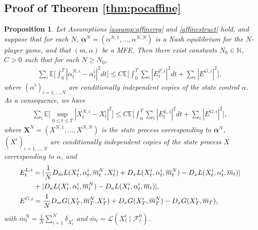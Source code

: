 \documentclass[11pt,reqno]{amsart}
\numberwithin{equation}{section}
\newtheorem{proposition}[theorem]{Proposition}
\theoremstyle{definition}
\def\E{{\mathbb E}}
\def\N{{\mathbb N}}
\newcommand{\bX}{\mathbf{X}}
\newcommand{\ov}{\overline}
\newcommand\cF{\mathcal F}
\newcommand\cL{\mathcal L}
\def \E{\mathbb{E}}
\def \N{\mathbb{N}}
\begin{document}
\subsection{Proof of Theorem \ref{thm:pocaffine}}
\label{subsec:proofaffine}

\begin{proposition} \label{prop:mainestaffine}
 Let Assumptions \ref{assump:affinereg} and \ref{affinestruct} hold, and suppose that for each $N$, $\bm\alpha^N = (\alpha^{N,1},\dots,\alpha^{N,N})$ is a Nash equilibrium for the $N$-player game, and that $(m,\alpha)$ be a MFE. Then there exist constants $N_0 \in \N$, $C  > 0$ such that for each $N \geq N_0$,
\begin{align}
\label{eq:alpha.bound2}
  \sum_{ i } \E\bigg[\int_0^T |\alpha^{N,i}_t - \alpha^i_t|^2 dt\bigg] \leq C \E \bigg[ \int_0^T  \sum_i |E_t^{F,i}|^2 dt +  \sum_i |E^{G,i}|^2 \bigg], 
\end{align}
where 
$(\alpha^i)_{i = 1,\dots,N}$ are conditionally independent copies of the state control $\alpha$.
As a consequence, we have
\begin{align} \label{penbound2}
  \sum_{ i} \E\Big[\sup_{0 \leq t \leq T} |X^{N,i}_t - X^i_t|^2 \Big] \leq C \E \bigg[ \int_0^T  \sum_i |E_t^{L,i}|^2 dt +  \sum_i |E^{G,i}|^2 \bigg], 
\end{align}
where 
$\bX^N = (X^{N,1},\dots,X^{N,N})$ is the state process corresponding to $\bm \alpha^N$, $(X^i)_{i = 1,\dots,N}$ are conditionally independent copies of the state process $X$ corresponding to $\alpha$, and
\begin{align}
\label{eq:def.errorsaffine}
  &E_t^{L,i} =  | \frac{1}{N} D_m L(X_t^{i}, \alpha_t^{i}, \ov{m}_t^N, X_t^{i}) + D_x L(X_t^i,\alpha_t^i, \ov{m}_t^N) -  D_x L(X_t^i,\alpha_t^i, \ov{m}_t)|  \nonumber \\ &\qquad + |D_a L(X_t^i,\alpha_t^i, \ov{m}_t^N) -  D_a L(X_t^i, \alpha_t^i, \ov{m}_t)|,   \\
  \vspace{.1cm}
  \label{eq:def.EG2}
  &E^{G,i} = \frac{1}{N} D_m G(X_T^{i}, \ov{m}_T^N. X_T^{i}) +D_x G(X_T^i, \ov{m}_T^N) - D_x G(X_T^i, \ov{m}_T), 
\end{align}
with $\ov{m}_t^N = \frac1N\sum_{i = 1}^{N} \delta_{X_t^i}$ and $\ov{m}_t = \cL(X^i_t\mid \cF^0_t)$.
\end{proposition}
\end{document}
